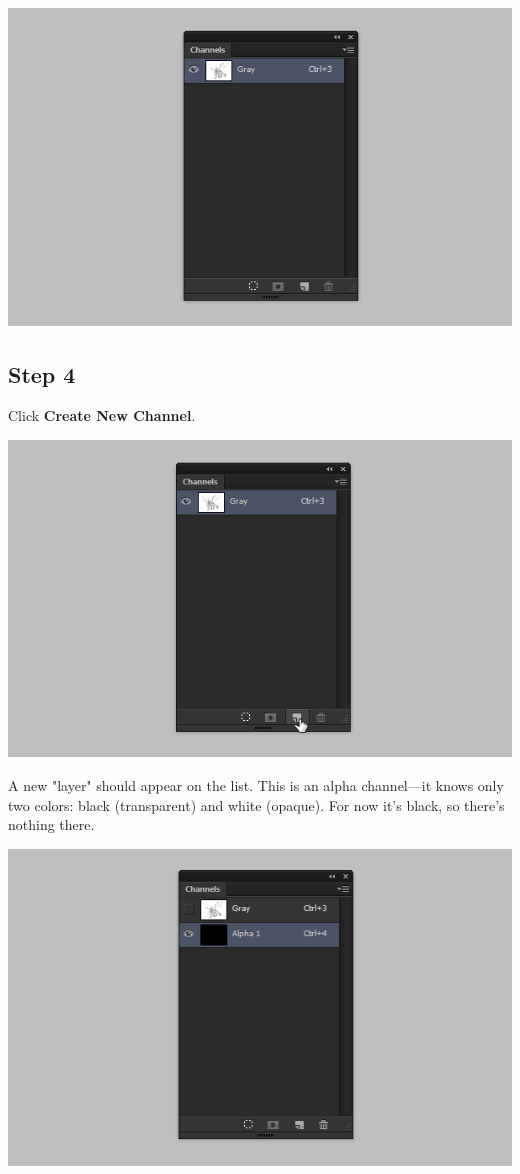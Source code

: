 \begin{center}
\includegraphics[width=0.7\linewidth]{Photos/quick-lineart-channels-panel}
\end{center}

\subsection{Step 4}
Click \textbf{Create New Channel}.

\begin{center}
\includegraphics[width=0.7\linewidth]{Photos/quick-lineart-new-channel}
\end{center}

A new "layer" should appear on the list. This is an alpha channel—it knows only two colors: black (transparent) and white (opaque). For now it's black, so there's nothing there.

\begin{center}
\includegraphics[width=0.7\linewidth]{Photos/quick-lineart-new-alpha}
\end{center}

